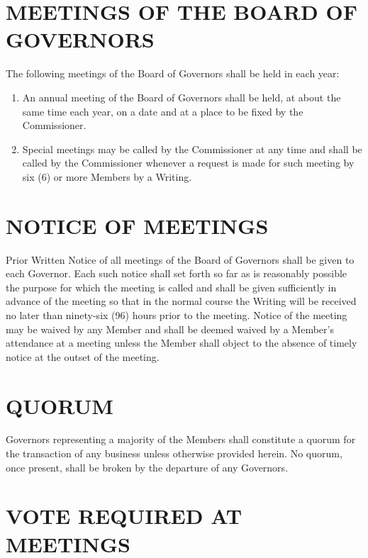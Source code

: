 \documentclass[]{book}
\providecommand{\tightlist}{%
  \setlength{\itemsep}{0pt}\setlength{\parskip}{0pt}}
\begin{document}
\hypertarget{meetings-of-the-board-of-governors}{%
\section{MEETINGS OF THE BOARD OF GOVERNORS}\label{meetings-of-the-board-of-governors}}

The following meetings of the Board of Governors shall be held in each year:

\begin{enumerate}
\def\labelenumi{(\alph{enumi})}
\tightlist
\item
  An annual meeting of the Board of Governors shall be held, at about the same time each year, on a date and at a place to be fixed by the Commissioner.
\item
  Special meetings may be called by the Commissioner at any time and shall be called by the Commissioner whenever a request is made for such meeting by six (6) or more Members by a Writing.
\end{enumerate}

\hypertarget{notice-of-meetings}{%
\section{NOTICE OF MEETINGS}\label{notice-of-meetings}}

Prior Written Notice of all meetings of the Board of Governors shall be given to each Governor. Each such notice shall set forth so far as is reasonably possible the purpose for which the meeting is called and shall be given sufficiently in advance of the meeting so that in the normal course the Writing will be received no later than ninety-six (96) hours prior to the meeting. Notice of the meeting may be waived by any Member and shall be deemed waived by a Member's attendance at a meeting unless the Member shall object to the absence of timely notice at the outset of the meeting.

\hypertarget{quorum}{%
\section{QUORUM}\label{quorum}}

Governors representing a majority of the Members shall constitute a quorum for the transaction of any business unless otherwise provided herein. No quorum, once present, shall be broken by the departure of any Governors.

\hypertarget{vote-required-at-meetings}{%
\section{VOTE REQUIRED AT MEETINGS}\label{vote-required-at-meetings}}
\end{document}
